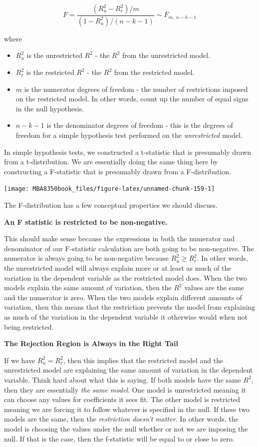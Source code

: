 \documentclass[
]{book}
\begin{document}
\[F=\frac{(R^2_u - R^2_r)/m}{(1-R^2_u)/(n-k-1)} \sim F_{m,\;n-k-1}\]

where

\begin{itemize}
\item
  \(R^2_u\) is the unrestricted \(R^2\) - the \(R^2\) from the unrestricted model.
\item
  \(R^2_r\) is the restricted \(R^2\) - the \(R^2\) from the restricted model.
\item
  \(m\) is the numerator degrees of freedom - the number of restrictions imposed on the restricted model. In other words, count up the number of equal signs in the null hypothesis.
\item
  \(n-k-1\) is the denominator degrees of freedom - this is the degrees of freedom for a simple hypothesis test performed on the \emph{unrestricted} model.
\end{itemize}

In simple hypothesis tests, we constructed a t-statistic that is presumably drawn from a t-distribution. We are essentially doing the same thing here by constructing a F-statistic that is presumably drawn from a F-distribution.

\begin{center}\texttt{[image: MBA8350book\_files/figure-latex/unnamed-chunk-159-1]} \end{center}

The F-distribution has a few conceptual properties we should discuss.

\textbf{An F statistic is restricted to be non-negative.}

This should make sense because the expressions in both the numerator and denominator of our F-statistic calculation are both going to be non-negative. The numerator is always going to be non-negative because \(R^2_u \geq R^2_r\). In other words, the unrestricted model will always explain more or at least as much of the variation in the dependent variable as the restricted model does. When the two models explain the same amount of variation, then the \(R^2\) values are the same and the numerator is zero. When the two models explain different amounts of variation, then this means that the restriction prevents the model from explaining as much of the variation in the dependent variable it otherwise would when not being restricted.

\textbf{The Rejection Region is Always in the Right Tail}

If we have \(R^2_u = R^2_r\), then this implies that the restricted model and the unrestricted model are explaining the same amount of variation in the dependent variable. Think hard about what this is saying. If both models have the same \(R^2\), then they are essentially \emph{the same model}. One model is unrestricted meaning it can choose any values for coefficients it sees fit. The other model is restricted meaning we are forcing it to follow whatever is specified in the null. If these two models are the same, then the \emph{restriction doesn't matter}. In other words, the model is choosing the values under the null whether or not we are imposing the null. If that is the case, then the f-statistic will be equal to or close to zero.
\end{document}
